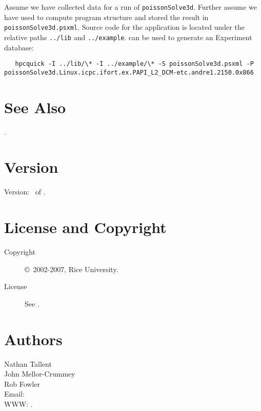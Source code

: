 \documentclass[english]{article}
\begin{document}
Assume we have collected  data for a run of \texttt{poissonSolve3d}.  Further assume we have used  to compute program structure and stored the result in \texttt{poissonSolve3d.psxml}.  Source code for the application is located under the relative paths \verb+../lib+ and \verb+../example+.   can be used to generate an Experiment database:
\begin{verbatim}
   hpcquick -I ../lib/\* -I ../example/\* -S poissonSolve3d.psxml -P poissonSolve3d.Linux.icpc.ifort.ex.PAPI_L2_DCM-etc.andre1.2150.0x866
\end{verbatim}




\section{See Also}

.

\section{Version}

Version: \Version\ of \Date.

\section{License and Copyright}

\begin{description}
\item[Copyright] \copyright\ 2002-2007, Rice University.
\item[License] See .
\end{description}

\section{Authors}

\noindent
Nathan Tallent \\
John Mellor-Crummey \\
Rob Fowler \\
Email:  \\
WWW: .

\LatexManEnd
\end{document}
